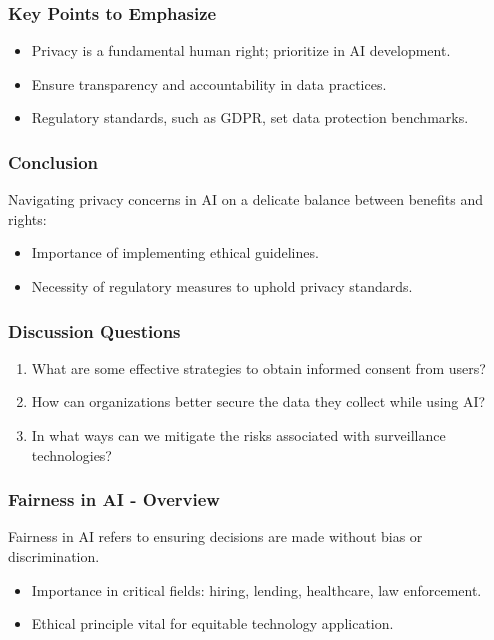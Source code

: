 \documentclass[aspectratio=169]{beamer}
\begin{document}
\begin{frame}[fragile]
  \frametitle{Key Points to Emphasize}
  \begin{itemize}
    \item Privacy is a fundamental human right; prioritize in AI development.
    \item Ensure transparency and accountability in data practices.
    \item Regulatory standards, such as GDPR, set data protection benchmarks.
  \end{itemize}
\end{frame}

\begin{frame}[fragile]
  \frametitle{Conclusion}
  Navigating privacy concerns in AI on a delicate balance between benefits and rights:
  \begin{itemize}
    \item Importance of implementing ethical guidelines.
    \item Necessity of regulatory measures to uphold privacy standards.
  \end{itemize}
\end{frame}

\begin{frame}[fragile]
  \frametitle{Discussion Questions}
  \begin{enumerate}
    \item What are some effective strategies to obtain informed consent from users?
    \item How can organizations better secure the data they collect while using AI?
    \item In what ways can we mitigate the risks associated with surveillance technologies? 
  \end{enumerate}
\end{frame}

\begin{frame}[fragile]
    \frametitle{Fairness in AI - Overview}
    Fairness in AI refers to ensuring decisions are made without bias or discrimination.
    
    \begin{itemize}
        \item Importance in critical fields: hiring, lending, healthcare, law enforcement.
        \item Ethical principle vital for equitable technology application.
    \end{itemize}
\end{frame}
\end{document}

